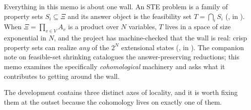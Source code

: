 \documentclass[11pt]{article}
\newcommand{\Hyp}{\Xi}
\begin{document}
Everything in this memo is about one wall.  An STE problem
\citep{combettes1993} is a family of property sets $S_i \subseteq
\Hyp$ and its answer object is the feasibility set $T = \bigcap_i S_i$
(,  in
).  When $\Hyp = \prod_{v \in V} A_v$ is a product
over $N$ variables, $T$ lives in a space of size exponential in $N$,
and the project has machine-checked that the wall is real: crisp
property sets can realize \emph{any} of the $2^N$ extensional states
(,
 in
).  The companion note on
feasible-set shrinking catalogues the answer-preserving reductions;
this memo examines the specifically \emph{cohomological} machinery and
asks what it contributes to getting around the wall.

The development contains three distinct axes of locality, and it is
worth fixing them at the outset because the cohomology lives on
exactly one of them.
\end{document}
